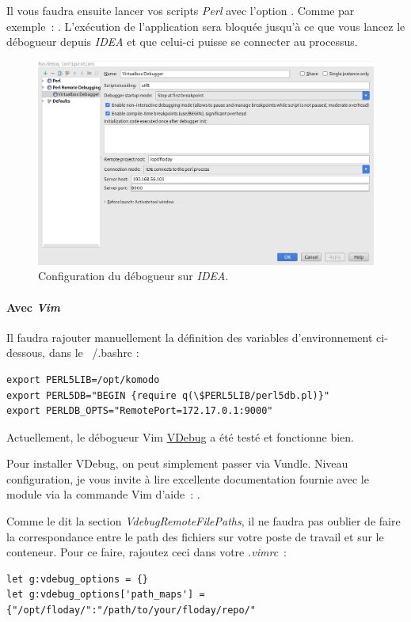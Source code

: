 Il vous faudra ensuite lancer vos scripts \emph{Perl} avec l'option .
Comme par exemple~: .
L'exécution de l'application sera bloquée jusqu'à ce que vous lancez le débogueur depuis \emph{IDEA} et que celui-ci puisse se connecter au processus.

\begin{figure}
	\centering
	\caption{Configuration du débogueur sur \emph{IDEA}.}
	\label{dev_dev_dbg_idea}
	\includegraphics[width=\textwidth]{part/developpement/dev/figs/fig_dbg_idea.png}
\end{figure}

\paragraph{Avec \emph{Vim}}
Il faudra rajouter manuellement la définition des variables d'environnement ci-dessous, dans le ~/.bashrc :

\begin{lstlisting}
export PERL5LIB=/opt/komodo
export PERL5DB="BEGIN {require q(\$PERL5LIB/perl5db.pl)}"
export PERLDB_OPTS="RemotePort=172.17.0.1:9000"
\end{lstlisting}

Actuellement, le débogueur Vim \href{https://github.com/joonty/vdebug}{VDebug} a été testé et fonctionne bien.

Pour installer VDebug, on peut simplement passer via Vundle. Niveau configuration, je vous invite à lire excellente documentation fournie avec le module via la commande Vim d'aide~: .

Comme le dit la section \emph{VdebugRemoteFilePaths}, il ne faudra pas oublier de faire la correspondance entre le path des fichiers sur votre poste de travail et sur le conteneur. Pour ce faire, rajoutez ceci dans votre \emph{.vimrc}~:

\begin{lstlisting}
let g:vdebug_options = {}
let g:vdebug_options['path_maps'] = {"/opt/floday/":"/path/to/your/floday/repo/"
\end{lstlisting}

